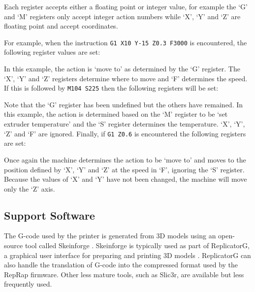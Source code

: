 			Each register accepts either a floating point or integer value, for
			example the `G' and `M' registers only accept integer action numbers while
			`X', `Y' and `Z' are floating point and accept coordinates.
			
			For example, when the instruction \verb|G1 X10 Y-15 Z0.3 F3000| is encountered,
			the following register values are set:
			
			\begin{gcoderegs}
			\end{gcoderegs}
			
			In this example, the action is `move to' as determined by the `G'
			register. The `X', `Y' and `Z' registers determine where to move and
			`F' determines the speed. If this is followed by \verb|M104 S225| then the
			following registers will be set:
			
			\begin{gcoderegs}
				\reg{F}{3000}
				\reg{M}{104}
				\reg{S}{225}
				\reg{X}{10}
				\reg{Y}{-15}
				\reg{Z}{0.3}
			\end{gcoderegs}
			
			Note that the `G' register has been undefined but the others have
			remained. In this example, the action is determined based on the `M'
			register to be `set extruder temperature' and the `S' register determines
			the temperature. `X', `Y', `Z' and `F' are ignored. Finally, if
			\verb|G1 Z0.6| is encountered the following registers are set:
			
			\begin{gcoderegs}
				\reg{G}{1}
				\reg{Z}{0.6}
			\end{gcoderegs}
			
			Once again the machine determines the action to be `move to' and moves to
			the position defined by `X', `Y' and `Z' at the speed in `F', ignoring the
			`S' register.  Because the values of `X' and `Y' have not been changed, the
			machine will move only the `Z' axis.
		
		\subsection{Support Software}
			
			The G-code used by the printer is generated from 3D models using an
			open-source tool called Skeinforge \cite{skeinforge}. Skeinforge is
			typically used as part of ReplicatorG, a graphical user interface for
			preparing and printing 3D models \cite{replicatorg}. ReplicatorG can also
			handle the translation of G-code into the compressed format used by the
			RepRap firmware.  Other less mature tools, such as Slic3r, are available
			but less frequently used.
		
